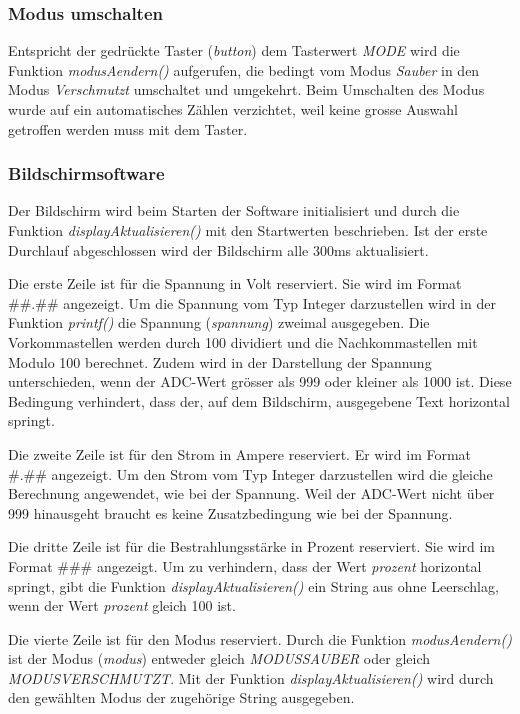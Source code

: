 \subsubsection{Modus umschalten}
Entspricht der gedrückte Taster (\textit{button}) dem Tasterwert \textit{MODE} wird die Funktion \textit{modusAendern()} aufgerufen, die bedingt vom Modus \textit{Sauber} in den Modus \textit{Verschmutzt} umschaltet und umgekehrt. Beim Umschalten des Modus wurde auf ein automatisches Zählen verzichtet, weil keine grosse Auswahl getroffen werden muss mit dem Taster.

\subsubsection{Bildschirmsoftware}
Der Bildschirm wird beim Starten der Software initialisiert und durch die Funktion \textit{displayAktualisieren()} mit den Startwerten beschrieben. Ist der erste Durchlauf abgeschlossen wird der Bildschirm alle 300ms aktualisiert.

Die erste Zeile ist für die Spannung in Volt reserviert. Sie wird im Format \#\#.\#\# angezeigt. Um die Spannung vom Typ Integer darzustellen wird in der Funktion \textit{printf()} die Spannung (\textit{spannung}) zweimal ausgegeben.%
Die Vorkommastellen werden durch 100 dividiert und die Nachkommastellen mit Modulo 100 berechnet. Zudem wird in der Darstellung der Spannung unterschieden, wenn der ADC-Wert grösser als 999 oder kleiner als 1000 ist. Diese Bedingung verhindert, dass der, auf dem Bildschirm, ausgegebene Text horizontal springt.

Die zweite Zeile ist für den Strom in Ampere reserviert. Er wird im Format \#.\#\# angezeigt. Um den Strom vom Typ Integer darzustellen wird die gleiche Berechnung angewendet, wie bei der Spannung. Weil der ADC-Wert nicht über 999 hinausgeht braucht es keine Zusatzbedingung wie bei der Spannung.

Die dritte Zeile ist für die Bestrahlungsstärke in Prozent reserviert. Sie wird im Format \#\#\# angezeigt. Um zu verhindern, dass der Wert \textit{prozent} horizontal springt, gibt die Funktion \textit{displayAktualisieren()} ein String aus ohne Leerschlag, wenn der Wert \textit{prozent} gleich 100 ist.

Die vierte Zeile ist für den Modus reserviert. Durch die Funktion \textit{modusAendern()} ist der Modus (\textit{modus}) entweder gleich \textit{MODUSSAUBER} oder gleich \textit{MODUSVERSCHMUTZT}. Mit der Funktion \textit{displayAktualisieren()} wird durch den gewählten Modus der zugehörige String ausgegeben.